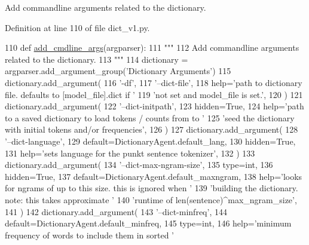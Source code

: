 \begin{DoxyVerb}Add commandline arguments related to the dictionary.
\end{DoxyVerb}
 

Definition at line 110 of file dict\+\_\+v1.\+py.


\begin{DoxyCode}
110     \textcolor{keyword}{def }\hyperlink{namespaceparlai_1_1agents_1_1drqa_1_1config_a62fdd5554f1da6be0cba185271058320}{add\_cmdline\_args}(argparser):
111         \textcolor{stringliteral}{"""}
112 \textcolor{stringliteral}{        Add commandline arguments related to the dictionary.}
113 \textcolor{stringliteral}{        """}
114         dictionary = argparser.add\_argument\_group(\textcolor{stringliteral}{'Dictionary Arguments'})
115         dictionary.add\_argument(
116             \textcolor{stringliteral}{'-df'},
117             \textcolor{stringliteral}{'--dict-file'},
118             help=\textcolor{stringliteral}{'path to dictionary file. defaults to [model\_file].dict if '}
119             \textcolor{stringliteral}{'not set and model\_file is set.'},
120         )
121         dictionary.add\_argument(
122             \textcolor{stringliteral}{'--dict-initpath'},
123             hidden=\textcolor{keyword}{True},
124             help=\textcolor{stringliteral}{'path to a saved dictionary to load tokens / counts from to '}
125             \textcolor{stringliteral}{'seed the dictionary with initial tokens and/or frequencies'},
126         )
127         dictionary.add\_argument(
128             \textcolor{stringliteral}{'--dict-language'},
129             default=DictionaryAgent.default\_lang,
130             hidden=\textcolor{keyword}{True},
131             help=\textcolor{stringliteral}{'sets language for the punkt sentence tokenizer'},
132         )
133         dictionary.add\_argument(
134             \textcolor{stringliteral}{'--dict-max-ngram-size'},
135             type=int,
136             hidden=\textcolor{keyword}{True},
137             default=DictionaryAgent.default\_maxngram,
138             help=\textcolor{stringliteral}{'looks for ngrams of up to this size. this is ignored when '}
139             \textcolor{stringliteral}{'building the dictionary. note: this takes approximate '}
140             \textcolor{stringliteral}{'runtime of len(sentence)^max\_ngram\_size'},
141         )
142         dictionary.add\_argument(
143             \textcolor{stringliteral}{'--dict-minfreq'},
144             default=DictionaryAgent.default\_minfreq,
145             type=int,
146             help=\textcolor{stringliteral}{'minimum frequency of words to include them in sorted '}

\end{DoxyCode}
